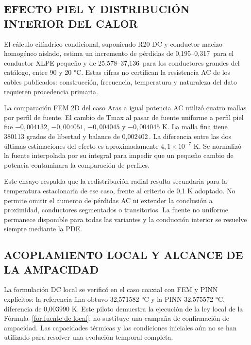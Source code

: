 

\subsection{EFECTO PIEL Y DISTRIBUCIÓN INTERIOR DEL CALOR}

El cálculo cilíndrico condicional, suponiendo R20 DC y conductor macizo homogéneo aislado, estima un incremento de pérdidas de 0,195--0,317\,\pct{} para el conductor XLPE pequeño y de 25,578--37,136\,\pct{} para los conductores grandes del catálogo, entre 90 y 20 °C. Estas cifras no certifican la resistencia AC de los cables publicados: construcción, frecuencia, temperatura y naturaleza del dato requieren procedencia primaria.

La comparación FEM 2D del caso Aras a igual potencia AC utilizó cuatro mallas por perfil de fuente. El cambio de Tmax al pasar de fuente uniforme a perfil piel fue $-0,004132$, $-0,004051$, $-0,004045$ y $-0,004045$ K. La malla fina tiene 380113 grados de libertad y balance de 0,002402\,\pct{}. La diferencia entre las dos últimas estimaciones del efecto es aproximadamente $4,1\times10^{-7}$ K. Se normalizó la fuente interpolada por su integral para impedir que un pequeño cambio de potencia contaminara la comparación de perfiles.

Este ensayo respalda que la redistribución radial resulta secundaria para la temperatura estacionaria de ese caso, frente al criterio de 0,1 K adoptado. No permite omitir el aumento de pérdidas AC ni extender la conclusión a proximidad, conductores segmentados o transitorios. La fuente no uniforme permanece disponible para todas las variantes y la conducción interior se resuelve siempre mediante la PDE.

\subsection{ACOPLAMIENTO LOCAL Y ALCANCE DE LA AMPACIDAD}

La formulación DC local se verificó en el caso coaxial con FEM y PINN explícitos: la referencia fina obtuvo 32,571582 °C y la PINN 32,575572 °C, diferencia de 0,003990 K. Este piloto demuestra la ejecución de la ley local de la Fórmula~\ref{for:fuente-dc-local}; no sustituye una campaña de confirmación de ampacidad. Las capacidades térmicas y las condiciones iniciales aún no se han utilizado para resolver una evolución temporal completa.



